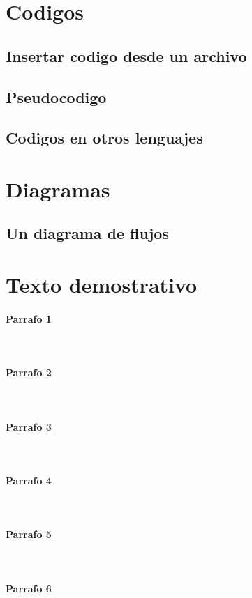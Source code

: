 \documentclass[12pt,a4paper,oneside]{article}
\title{\titulodoc}
\author{\autordoc}
\date{\fechadoc}
\begin{document}
\titlepg %


\section{Codigos}
\subsection{Insertar codigo desde un archivo}


\subsection{Pseudocodigo}

\newpage
\subsection{Codigos en otros lenguajes}


\newpage
\section{Diagramas}
\subsection{Un diagrama de flujos}
\vspace{2cm}


\newpage
\section{Texto demostrativo}
\paragraph{Parrafo 1}
\lipsum[1]\\
\paragraph{Parrafo 2}
\lipsum[2]\\
\paragraph{Parrafo 3}
\lipsum[3]\\
\paragraph{Parrafo 4}
\lipsum[4]\\
\paragraph{Parrafo 5}
\lipsum[5]\\
\paragraph{Parrafo 6}
\lipsum[6]\\
\end{document}
